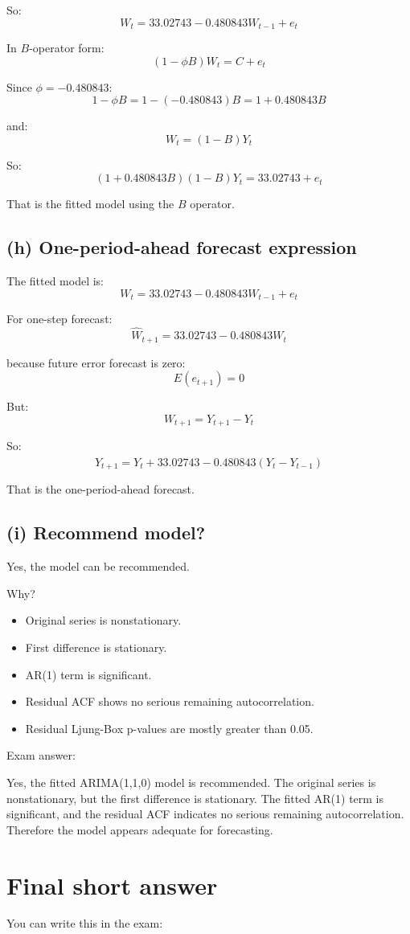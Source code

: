 \documentclass[11pt]{article}
\begin{document}
So:
\[
W_t = 33.02743 - 0.480843W_{t-1} + e_t
\]

In $B$-operator form:
\[
(1-\phi B)W_t = C + e_t
\]

Since $\phi=-0.480843$:
\[
1-\phi B = 1 - (-0.480843)B = 1 + 0.480843B
\]

and:
\[
W_t=(1-B)Y_t
\]

So:
\[
\boxed{(1+0.480843B)(1-B)Y_t = 33.02743 + e_t}
\]

That is the fitted model using the $B$ operator.

\subsection*{(h) One-period-ahead forecast expression}
The fitted model is:
\[
W_t = 33.02743 - 0.480843W_{t-1} + e_t
\]

For one-step forecast:
\[
\hat{W}_{t+1}=33.02743-0.480843W_t
\]

because future error forecast is zero:
\[
E(e_{t+1})=0
\]

But:
\[
W_{t+1}=Y_{t+1}-Y_t
\]

So:
\[
\hat{Y}_{t+1}=Y_t+33.02743-0.480843(Y_t-Y_{t-1})
\]

That is the one-period-ahead forecast.

\subsection*{(i) Recommend model?}
Yes, the model can be recommended.

Why?
\begin{itemize}
  \item Original series is nonstationary.
  \item First difference is stationary.
  \item AR(1) term is significant.
  \item Residual ACF shows no serious remaining autocorrelation.
  \item Residual Ljung-Box p-values are mostly greater than 0.05.
\end{itemize}

Exam answer:

Yes, the fitted ARIMA(1,1,0) model is recommended. The original series is nonstationary, but the first difference is stationary. The fitted AR(1) term is significant, and the residual ACF indicates no serious remaining autocorrelation. Therefore the model appears adequate for forecasting.

\section*{Final short answer}
You can write this in the exam:
\end{document}
